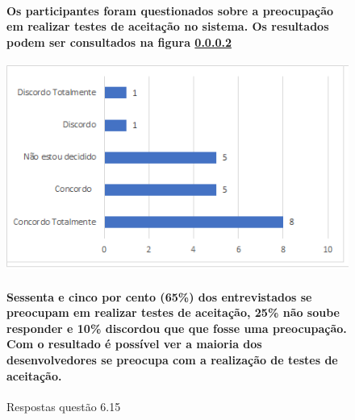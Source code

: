 \begin{figure}[!t]
\centering
\paragraph{Os participantes foram questionados sobre a preocupação em realizar testes de aceitação no sistema. Os resultados podem ser consultados na figura \ref{fig:6.15}}
\includegraphics[scale=0.7]{figuras das questoes/6.15.png}
\caption{Respostas questão 6.15}
\paragraph{Sessenta e cinco por cento (65{\%}) dos entrevistados se preocupam em realizar testes de aceitação, 25{\%} não soube responder e 10{\%} discordou que que fosse uma preocupação. Com o resultado é possível ver a maioria dos desenvolvedores se preocupa com a realização de testes de aceitação.}
\label{fig:6.15}
\end{figure}
